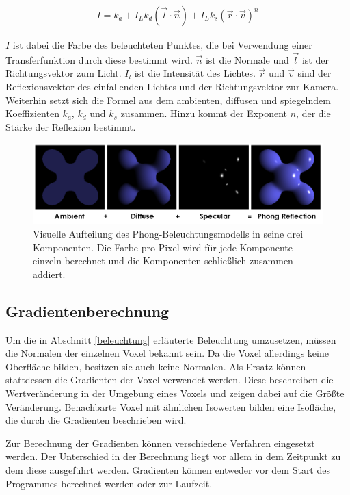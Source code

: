\begin{align}
I = k_{a}+I_{L}k_{d}(\vec{l}\cdot\vec{n})+I_{L}k_{s}(\vec{r}\cdot\vec{v})^n
\end{align}


$I$ ist dabei die Farbe des beleuchteten Punktes, die bei Verwendung einer Transferfunktion durch diese bestimmt wird. $\vec{n}$ ist die Normale und $\vec{l}$ ist der Richtungsvektor zum Licht. $I_{l}$ ist die Intensität des Lichtes. $\vec{r}$ und $\vec{v}$ sind der Reflexionsvektor des einfallenden Lichtes und der Richtungsvektor zur Kamera. Weiterhin setzt sich die Formel aus dem ambienten, diffusen und spiegelndem Koeffizienten $k_{a}$, $k_{d}$ und $k_{s}$ zusammen. Hinzu kommt der Exponent $n$, der die Stärke der Reflexion bestimmt. 

\begin{figure}[!htb]
	\centering
	\includegraphics[width=0.7\linewidth]{images/Phong_components_version_4.png}
	\caption{Visuelle Aufteilung des Phong-Beleuchtungsmodells in seine drei Komponenten. Die Farbe pro Pixel wird für jede Komponente einzeln berechnet und die Komponenten schließlich zusammen addiert.}
	\label{img:phong}
\end{figure}
\FloatBarrier

\subsection{Gradientenberechnung}

Um die in Abschnitt \ref{beleuchtung} erläuterte Beleuchtung umzusetzen, müssen die Normalen der einzelnen Voxel bekannt sein. Da die Voxel allerdings keine Oberfläche bilden, besitzen sie auch keine Normalen. Als Ersatz können stattdessen die Gradienten der Voxel verwendet werden. Diese beschreiben die Wertveränderung in der Umgebung eines Voxels und zeigen dabei auf die Größte Veränderung. Benachbarte Voxel mit ähnlichen Isowerten bilden eine Isofläche, die durch die Gradienten beschrieben wird. 

Zur Berechnung der Gradienten können verschiedene Verfahren eingesetzt werden. Der Unterschied in der Berechnung liegt vor allem in dem Zeitpunkt zu dem diese ausgeführt werden. Gradienten können entweder vor dem Start des Programmes berechnet werden oder zur Laufzeit. 


